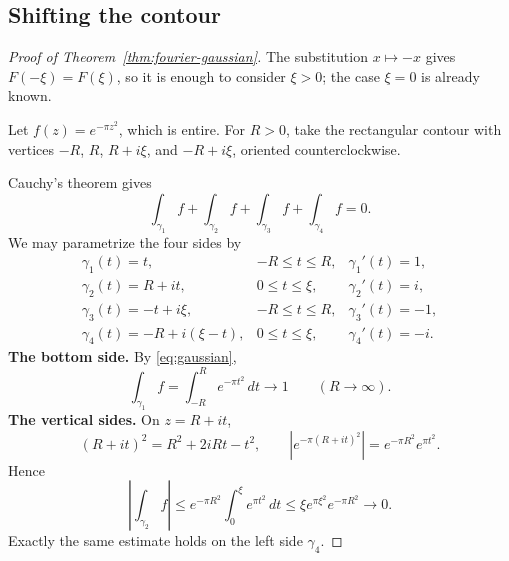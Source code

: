 \documentclass[11pt]{article}
\theoremstyle{plain}
\theoremstyle{definition}
\theoremstyle{remark}
\numberwithin{equation}{section}
\DeclareMathOperator{\Real}{Re}
\DeclareMathOperator{\Imag}{Im}
\begin{document}
\subsection{Shifting the contour}
\begin{proof}[Proof of Theorem~\ref{thm:fourier-gaussian}]
The substitution $x\mapsto-x$ gives $F(-\xi)=F(\xi)$, so it is enough to
consider $\xi>0$; the case $\xi=0$ is already known.

Let $f(z)=e^{-\pi z^2}$, which is entire. For $R>0$, take the rectangular
contour with vertices $-R$, $R$, $R+i\xi$, and $-R+i\xi$, oriented
counterclockwise.
\begin{center}
\end{center}
Cauchy's theorem gives
\begin{equation}\label{eq:rectangle}
 \int_{\gamma_1}f+\int_{\gamma_2}f+
 \int_{\gamma_3}f+\int_{\gamma_4}f=0.
\end{equation}
We may parametrize the four sides by
\[
\begin{array}{lll}
 \gamma_1(t)=t, & -R\leq t\leq R, & \gamma_1'(t)=1,\\[2pt]
 \gamma_2(t)=R+it, & 0\leq t\leq\xi, & \gamma_2'(t)=i,\\[2pt]
 \gamma_3(t)=-t+i\xi, & -R\leq t\leq R, & \gamma_3'(t)=-1,\\[2pt]
 \gamma_4(t)=-R+i(\xi-t), & 0\leq t\leq\xi, & \gamma_4'(t)=-i.
\end{array}
\]
\textbf{The bottom side.} By \eqref{eq:gaussian},
\[
 \int_{\gamma_1}f=\int_{-R}^{R}e^{-\pi t^2}\,dt\longrightarrow1
 \qquad(R\to\infty).
\]
\textbf{The vertical sides.} On $z=R+it$,
\[
 (R+it)^2=R^2+2iRt-t^2,
 \qquad |e^{-\pi(R+it)^2}|=e^{-\pi R^2}e^{\pi t^2}.
\]
Hence
\[
 \left|\int_{\gamma_2}f\right|
 \leq e^{-\pi R^2}\int_0^\xi e^{\pi t^2}\,dt
 \leq \xi e^{\pi\xi^2}e^{-\pi R^2}\longrightarrow0.
\]
Exactly the same estimate holds on the left side $\gamma_4$.



\end{proof}
\end{document}
